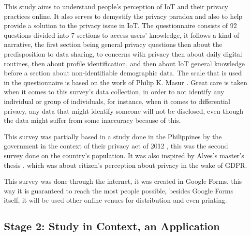 \documentclass[manuscript,natbib=false]{acmart}
\begin{document}
This study aims to understand people's perception of IoT and their privacy
practices online. It also serves to demystify the privacy paradox and also
to help provide a solution to the privacy issue in IoT. The questionnaire
consists of 92 questions divided into 7 sections to access users' knowledge,
it follows a kind of narrative, the first section being general privacy
questions then about the predisposition to data sharing, to concerns with
privacy then about daily digital routines, then about profile identification,
and then about IoT general knowledge before a section about non-identifiable
demographic data. The scale that is used in the questionnaire is based on
the work of Philip K. Masur \cite{masur2018situational}. Great care is taken
when it comes to this survey's data collection, in order to not identify
any individual or group of individuals, for instance, when it comes to differential
privacy, any data that might identify someone will not be disclosed, even
though the data might suffer from some inaccuracy because of this.

This survey was partially based in a study done in the Philippines by the
government in the context of their privacy act of 2012 \cite{Philippine2022Conduct},
this was the second survey done on the country's population. It was also
inspired by Alves's master's thesis \cite{Alves2021}, which was about citizen's
perception about privacy in the wake of GDPR.

This survey was done through the internet, it was created in Google Forms,
this way it is guaranteed to reach the most people possible, besides Google
Forms itself, it will be used other online venues for distribution and even
printing.

\subsection{Stage 2: Study in Context, an Application}
\end{document}
